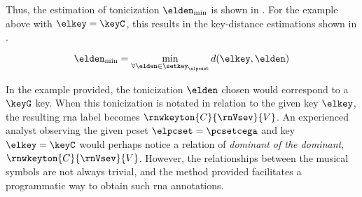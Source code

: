 Thus, the estimation of tonicization $\elden_{\min}$ is
shown in . For the example
above with $\elkey = \keyC$, this results in the
key-distance estimations shown in
.

\begin{equation}
    \label{eq:tonicization_estimation}
    \elden_{\min} = \min_{\forall \elden \in \setkey_\elpcset} d(\elkey, \elden)
\end{equation}


In the example provided, the tonicization $\elden$ chosen
would correspond to a $\keyG$ key. When this tonicization is
notated in relation to the given key $\elkey$, the resulting
\gls{rna} label becomes $\rnwkeyton{C}{\rnVsev}{V}$. An
experienced analyst observing the given \gls{pcset}
$\elpcset = \pcsetcega$ and key $\elkey = \keyC$ would
perhaps notice a relation of \emph{dominant of the
dominant}, $\rnwkeyton{C}{\rnVsev}{V}$. However, the
relationships between the musical symbols are not always
trivial, and the method provided facilitates a programmatic
way to obtain such \gls{rna} annotations.
